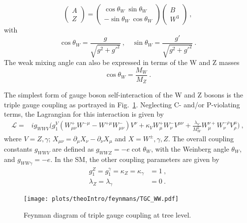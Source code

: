 \begin{equation}
\left( \begin{array}{c} A \\ Z \end{array} \right) = \left( \begin{array}{c} \cos \theta_W ~  \sin \theta_W \\ -\sin \theta_W ~  \cos \theta_W \end{array} \right) \left( \begin{array}{c} B \\ W^3 \end{array} \right) ~,
\end{equation}
with 
\begin{equation}
\cos \theta_W = \frac{g}{\sqrt{g^2+g'^2}} ~, \quad \sin \theta_W = \frac{g'}{\sqrt{g^2+g'^2}} ~.
\end{equation}
The weak mixing angle can also be expressed in terms of the W and Z masses
\begin{equation}
\cos \theta_W=\frac{M_W}{M_Z} ~.
\end{equation}








The simplest form of gauge boson self-interaction of the W and Z bosons is the triple gauge coupling as portrayed in Fig.~\ref{fig:theo:tgc}. Neglecting C- and/or P-violating terms, the Lagrangian for this interaction is given by \cite{EFT}
\begin{align}
\mathcal{L} =& ig_{WWV}\Big( g_1^V(W_{\mu\nu}^+W^{-\mu} - W^{+\mu}W_{\mu\nu}^-)V^{\nu} + \kappa_VW_\mu^+W_\nu^-V^{\mu\nu}  + \frac{\lambda_V}{M_W^2}W_\mu^{\nu+}W_\nu^{-\rho}V_\rho^\mu  \Big) ~, \label{eq:theo:EWKlag}
\end{align}
where $V=Z,\gamma$; $X_{\mu\nu}=\partial_\mu X_\nu -\partial_\nu X_\mu$ and $X=W^\pm,\gamma ,Z$. The overall coupling constants $g_{WWV}$ are defined as $g_{WWZ} = -e \cot \theta_W$, with the Weinberg angle $\theta_W$, and  $g_{WW\gamma} =-e$. In the SM, the other coupling parameters are given by
\begin{align}
g_1^Z = g_1^\gamma = \kappa_Z = \kappa_\gamma &= 1 ~, \\
\lambda_Z = \lambda_\gamma &= 0 ~.
\end{align}
\begin{figure}
	\centering
	\texttt{[image: plots/theoIntro/feynmans/TGC\_WW.pdf]}
	\caption[Feynman diagram of triple gauge coupling at tree level]{Feynman diagram of triple gauge coupling at tree level.}
	\label{fig:theo:tgc}
\end{figure}

